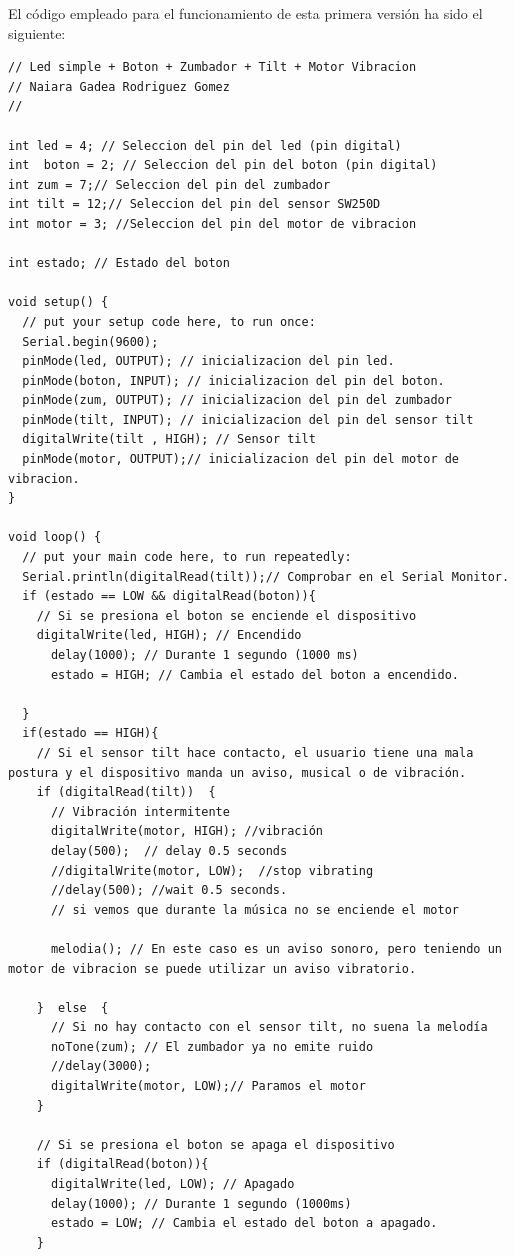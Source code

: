 \newpage
El código empleado para el funcionamiento de esta primera versión ha sido el siguiente:
\begin{lstlisting}
// Led simple + Boton + Zumbador + Tilt + Motor Vibracion
// Naiara Gadea Rodriguez Gomez
// 

int led = 4; // Seleccion del pin del led (pin digital)
int  boton = 2; // Seleccion del pin del boton (pin digital)
int zum = 7;// Seleccion del pin del zumbador
int tilt = 12;// Seleccion del pin del sensor SW250D
int motor = 3; //Seleccion del pin del motor de vibracion

int estado; // Estado del boton

void setup() {
  // put your setup code here, to run once:
  Serial.begin(9600);
  pinMode(led, OUTPUT); // inicializacion del pin led.
  pinMode(boton, INPUT); // inicializacion del pin del boton.
  pinMode(zum, OUTPUT); // inicializacion del pin del zumbador
  pinMode(tilt, INPUT); // inicializacion del pin del sensor tilt
  digitalWrite(tilt , HIGH); // Sensor tilt 
  pinMode(motor, OUTPUT);// inicializacion del pin del motor de vibracion.
}

void loop() {
  // put your main code here, to run repeatedly:
  Serial.println(digitalRead(tilt));// Comprobar en el Serial Monitor.
  if (estado == LOW && digitalRead(boton)){
    // Si se presiona el boton se enciende el dispositivo
    digitalWrite(led, HIGH); // Encendido
      delay(1000); // Durante 1 segundo (1000 ms)
      estado = HIGH; // Cambia el estado del boton a encendido.
    
  }
  if(estado == HIGH){
    // Si el sensor tilt hace contacto, el usuario tiene una mala postura y el dispositivo manda un aviso, musical o de vibración.
    if (digitalRead(tilt))  {
      // Vibración intermitente
      digitalWrite(motor, HIGH); //vibración
      delay(500);  // delay 0.5 seconds
      //digitalWrite(motor, LOW);  //stop vibrating
      //delay(500); //wait 0.5 seconds.
      // si vemos que durante la música no se enciende el motor
      
      melodia(); // En este caso es un aviso sonoro, pero teniendo un motor de vibracion se puede utilizar un aviso vibratorio.
      
    }  else  {
      // Si no hay contacto con el sensor tilt, no suena la melodía
      noTone(zum); // El zumbador ya no emite ruido
      //delay(3000);
      digitalWrite(motor, LOW);// Paramos el motor
    }

    // Si se presiona el boton se apaga el dispositivo
    if (digitalRead(boton)){
      digitalWrite(led, LOW); // Apagado
      delay(1000); // Durante 1 segundo (1000ms)
      estado = LOW; // Cambia el estado del boton a apagado.
    }
    

\end{lstlisting}
